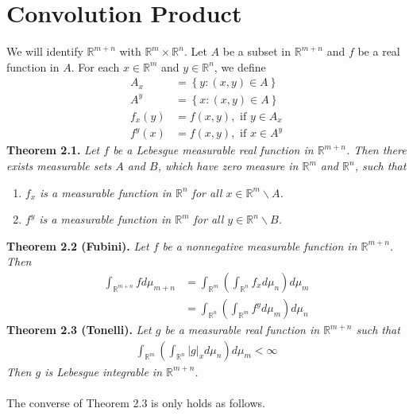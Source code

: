 \documentclass[a4paper]{article}
\numberwithin{equation}{section}
\begin{document}
\section{Convolution Product}
We will identify $\mathbb{R}^{m+n}$ with $\mathbb{R}^m\times \mathbb{R}^n$. Let $A$ be a subset in $\mathbb{R}^{m+n}$ and $f$ be a real function in $A$. For each $x\in \mathbb{R}^m$ and $y\in \mathbb{R}^n$, we define
\begin{align}
{A_x} &= \left\{ {y:\left( {x,y} \right) \in A} \right\}\\
{A^y} &= \left\{ {x:\left( {x,y} \right) \in A} \right\}\\
{f_x}\left( y \right) &= f\left( {x,y} \right),\mbox{ if }y \in {A_x}\\
{f^y}\left( x \right) &= f\left( {x,y} \right),\mbox{ if } x \in {A^y}
\end{align}
\textbf{Theorem 2.1.} \textit{Let $f$ be a Lebesgue measurable real function in $\mathbb{R}^{m+n}$. Then there exists measurable sets $A$ and $B$, which have zero measure in $\mathbb{R}^m$ and $\mathbb{R}^n$, such that}
\begin{enumerate}
\item \textit{$f_x$ is a measurable function in $\mathbb{R}^n$ for all $x\in \mathbb{R}^m\backslash A$.}
\item \textit{$f^y$ is a measurable function in $\mathbb{R}^m$ for all $y\in \mathbb{R}^n\backslash B$.}
\end{enumerate}
\textbf{Theorem 2.2 (Fubini).} \textit{Let $f$ be a nonnegative measurable function in $\mathbb{R}^{m+n}$. Then}
\begin{align}
\int_{{\mathbb{R}^{m + n}}} {fd{\mu _{m + n}}} & = \int_{{\mathbb{R}^m}} {\left( {\int_{{\mathbb{R}^n}} {{f_x}d{\mu _n}} } \right)d{\mu _m}} \\
& = \int_{{\mathbb{R}^n}} {\left( {\int_{{\mathbb{R}^m}} {{f^y}d{\mu _m}} } \right)d{\mu _n}} 
\end{align}
\textbf{Theorem 2.3 (Tonelli).} \textit{Let $g$ be a measurable real function in $\mathbb{R}^{m+n}$ such that}
\begin{align}
\int_{{\mathbb{R}^m}} {\left( {\int_{{\mathbb{R}^n}} {{{\left| g \right|}_x}d{\mu _n}} } \right)d{\mu _m}}  < \infty 
\end{align}
\textit{Then $g$ is Lebesgue integrable in $\mathbb{R}^{m+n}$.}\\
\\
The converse of Theorem 2.3 is only holds as follows.\\
\\
\end{document}
